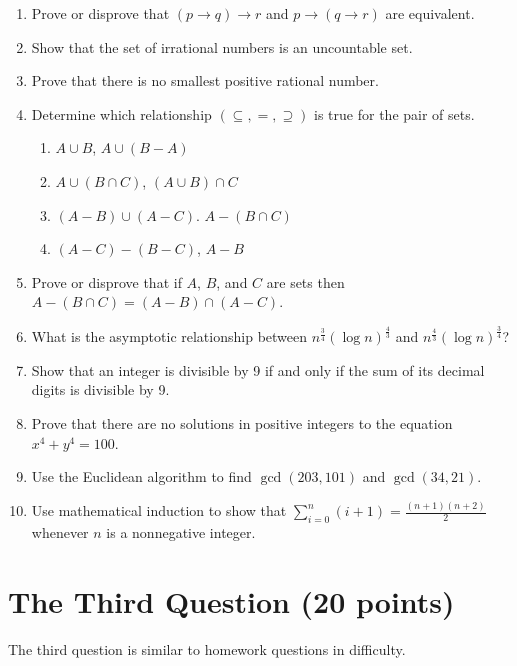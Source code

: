 \documentclass[11pt]{article}
\begin{document}
\begin{enumerate}
    \item Prove or disprove that $(p \to q) \to r$ and $p \to (q \to r)$ are equivalent.
    \item Show that the set of irrational numbers is an uncountable set.
    \item Prove that there is no smallest positive rational number.
    \item Determine which relationship $(\subseteq, =, \supseteq)$ is true for the pair of sets.
    \begin{enumerate}
        \item $A \cup B$, $A \cup (B - A)$
        \item $A \cup (B \cap C)$, $(A \cup B) \cap C$
        \item $(A - B) \cup (A - C)$. $A - (B \cap C)$
        \item $(A - C) - (B - C)$, $A - B$
    \end{enumerate}
    \item Prove or disprove that if $A$, $B$, and $C$ are sets then $A - (B \cap C) = (A - B) \cap (A - C)$.
    \item What is the asymptotic relationship between $n^{\frac{3}{4}}(\log n)^{\frac{4}{3}}$ and $n^{\frac{4}{3}}(\log n)^{\frac{3}{4}}$?
    \item Show that an integer is divisible by 9 if and only if the sum of its decimal digits is divisible by 9.
    \item Prove that there are no solutions in positive integers to the equation $x^4 + y^4 = 100$.
    \item Use the Euclidean algorithm to find $\gcd(203, 101)$ and $\gcd(34, 21)$.
    \item Use mathematical induction to show that $\sum_{i=0}^{n} (i + 1) = \frac{(n + 1)(n + 2)}{2}$ whenever $n$ is a nonnegative integer.
\end{enumerate}

\section{The Third Question (20 points)}
The third question is similar to homework questions in difficulty.
\end{document}
